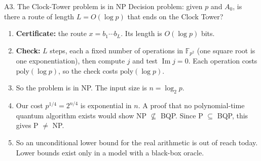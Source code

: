 \documentclass[aspectratio=169,10pt]{beamer}
\begin{document}
\begin{frame}{A3. The Clock-Tower problem is in NP}
\small
Decision problem: given $p$ and $A_0$, is there a route of length $L=O(\log p)$ that ends on the Clock Tower?
\begin{enumerate}
\item \textbf{Certificate:} the route $x=b_1\cdots b_L$. Its length is $O(\log p)$ bits.
\item \textbf{Check:} $L$ steps, each a fixed number of operations in $\mathbb F_{p^2}$ (one square root is one exponentiation), then compute $j$ and test $\operatorname{Im} j=0$. Each operation costs $\mathrm{poly}(\log p)$, so the check costs $\mathrm{poly}(\log p)$.
\item So the problem is in NP. The input size is $n=\log_2p$.
\item Our cost $p^{1/4}=2^{n/4}$ is exponential in $n$. A proof that no polynomial-time quantum algorithm exists would show NP $\not\subseteq$ BQP. Since P $\subseteq$ BQP, this gives P $\neq$ NP.
\item So an unconditional lower bound for the real arithmetic is out of reach today. Lower bounds exist only in a model with a black-box oracle.
\end{enumerate}
\end{frame}
\end{document}
